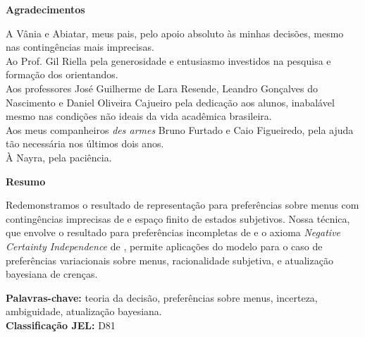 \documentclass[12pt, a4paper]{article}
\theoremstyle{nonumberplain}
\theoremstyle{plain}
\theoremstyle{plain}
\theoremstyle{plain}
\theoremstyle{nonumberplain}
\begin{document}
\begin{titlepage}
\begin{center}
\textbf{\Large Agradecimentos}
\end{center}
\vspace{1.5cm}
A Vânia e Abiatar, meus pais, pelo apoio absoluto às minhas decisões, mesmo nas contingências mais imprecisas. \\

\noindent
Ao Prof. Gil Riella pela generosidade e entusiasmo investidos na pesquisa e formação dos orientandos.\\ 

\noindent
Aos professores José Guilherme de Lara Resende, Leandro Gonçalves do Nascimento  e Daniel Oliveira Cajueiro pela dedicação aos alunos, inabalável mesmo nas condições não ideais da vida acadêmica brasileira.\\

\noindent
Aos meus companheiros \emph{des armes} Bruno Furtado e Caio Figueiredo, pela ajuda tão necessária nos últimos dois anos.\\ 

\noindent
À Nayra, pela paciência.     

 
\end{titlepage}

\begin{titlepage}
\begin{center}
\textbf{\Large Resumo}
\end{center}
\vspace{1.5cm}
Redemonstramos o resultado de representação para preferências sobre menus com contingências imprecisas de \cite{Epstein2007} e espaço finito de estados subjetivos. Nossa técnica, que envolve o resultado para preferências incompletas de \cite{Kochov2007} e o axioma \emph{Negative Certainty Independence} de \cite{Dil2010}, permite aplicações do modelo para o caso de preferências variacionais sobre menus, racionalidade subjetiva, e atualização bayesiana de crenças.   
\begin{flushleft}
\textbf{Palavras-chave:} teoria da decisão, preferências sobre menus, incerteza, ambiguidade, atualização bayesiana.\\

\textbf{Classificação JEL:} D81
\end{flushleft}
\end{titlepage}
\end{document}
